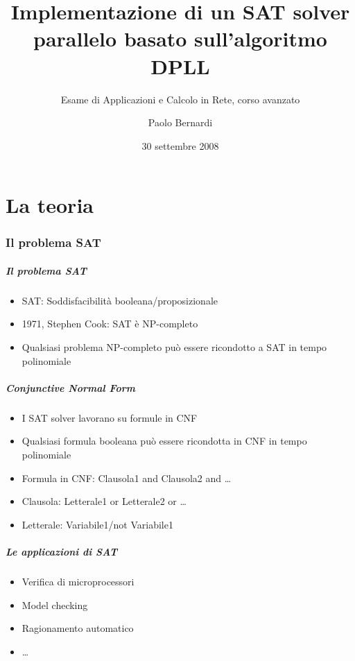\documentclass[12pt,xcolor=dvipsnames]{beamer}
\title{Implementazione di un SAT solver parallelo basato sull'algoritmo DPLL}
\author{Paolo Bernardi}
\subtitle{Esame di Applicazioni e Calcolo in Rete, corso avanzato}
\institute{Università degli Studi di Perugia - Corso di Laurea in Informatica}
\date{30 settembre 2008}
\begin{document}

\begin{frame}
	\titlepage
\end{frame}

\part{La teoria}

\begin{frame}
	\partpage
\end{frame}

\section{Il problema SAT}

\begin{frame}
	\frametitle{Il problema SAT}
	\begin{itemize}
	 \item SAT: Soddisfacibilità booleana/proposizionale \pause
	 \item 1971, Stephen Cook: SAT è NP-completo \pause
	 \item Qualsiasi problema NP-completo può essere ricondotto a SAT in tempo polinomiale
	\end{itemize}
\end{frame}

\begin{frame}
	\frametitle{Conjunctive Normal Form}
	\begin{itemize}
	 \item I SAT solver lavorano su formule in CNF \pause
	 \item Qualsiasi formula booleana può essere ricondotta in CNF in tempo polinomiale \pause
     \item Formula in CNF: Clausola1 and Clausola2 and \ldots{} \pause
     \item Clausola: Letterale1 or Letterale2 or \ldots{} \pause
     \item Letterale: Variabile1/not Variabile1
	\end{itemize}
\end{frame}

\begin{frame}
	\frametitle{Le applicazioni di SAT}
	\begin{itemize}
	 \item Verifica di microprocessori \pause
	 \item Model checking \pause
     \item Ragionamento automatico \pause
     \item \ldots{}
	\end{itemize}
\end{frame}
\end{document}
